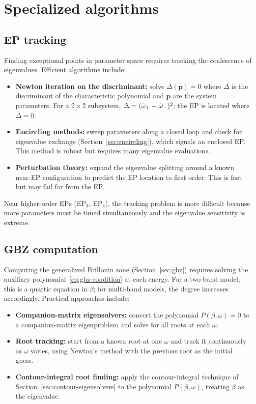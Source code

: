\section{Specialized algorithms}
\label{sec:specialized}

\subsection{EP tracking}
\label{ssec:ep-tracking}

Finding exceptional points in parameter space requires tracking the
coalescence of eigenvalues. Efficient algorithms include:
\begin{itemize}
 \item \textbf{Newton iteration on the discriminant:} solve
 $\Delta(\mathbf{p}) = 0$ where $\Delta$ is the discriminant of
 the characteristic polynomial and $\mathbf{p}$ are the system
 parameters. For a $2\times 2$ subsystem,
 $\Delta = (\tilde{\omega}_+ - \tilde{\omega}_-)^2$; the EP is located where
 $\Delta = 0$.
 \item \textbf{Encircling methods:} sweep parameters along a closed
 loop and check for eigenvalue exchange (Section~\ref{sec:encircling}),
 which signals an enclosed EP. This method is robust but
 requires many eigenvalue evaluations.
 \item \textbf{Perturbation theory:} expand the eigenvalue splitting
 around a known near-EP configuration to predict the EP location
 to first order. This is fast but may fail far from the EP.
\end{itemize}

Near higher-order EPs (EP$_3$, EP$_4$), the tracking problem is
more difficult because more parameters must be tuned simultaneously
and the eigenvalue sensitivity is extreme.

\subsection{GBZ computation}
\label{ssec:gbz-computation}

Computing the generalized Brillouin zone (Section~\ref{sec:gbz}) requires
solving the auxiliary polynomial~\eqref{eq:gbz-condition} at each energy.
For a two-band model, this is a quartic equation in $\beta$; for
multi-band models, the degree increases accordingly. Practical
approaches include:
\begin{itemize}
 \item \textbf{Companion-matrix eigensolvers:} convert the polynomial
 $P(\beta, \omega) = 0$ to a companion-matrix eigenproblem and solve
 for all roots at each $\omega$.
 \item \textbf{Root tracking:} start from a known root at one
 $\omega$ and track it continuously as $\omega$ varies, using
 Newton's method with the previous root as the initial guess.
 \item \textbf{Contour-integral root finding:} apply the
 contour-integral technique of
 Section~\ref{sec:contour-eigensolvers} to the polynomial
 $P(\beta, \omega)$, treating $\beta$ as the eigenvalue.
\end{itemize}


